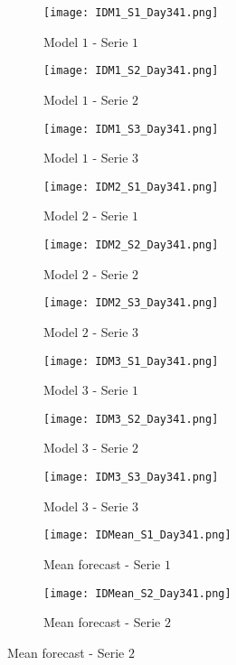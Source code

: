  \begin{figure}[ht]
 	\begin{subfigure}{0.32\textwidth}
 		\texttt{[image: IDM1\_S1\_Day341.png]}
 		\caption{Model $ 1 $ - Serie $ 1 $}
 	\end{subfigure}	 	
 	\begin{subfigure}{0.32\textwidth}
 		\texttt{[image: IDM1\_S2\_Day341.png]}
 		\caption{Model $ 1 $ - Serie $ 2 $}
 	\end{subfigure}	
 	\begin{subfigure}{0.32\textwidth}
 		\texttt{[image: IDM1\_S3\_Day341.png]}
 		\caption{Model $ 1 $ - Serie $ 3 $}
 	\end{subfigure}
  	\begin{subfigure}{0.32\textwidth}
 		\texttt{[image: IDM2\_S1\_Day341.png]}
 		\caption{Model $ 2 $ - Serie $ 1 $}
 	\end{subfigure}	 	
	 \begin{subfigure}{0.32\textwidth}
	 	\texttt{[image: IDM2\_S2\_Day341.png]}
	 	\caption{Model $ 2 $ - Serie $ 2 $}
	 \end{subfigure}	
	 \begin{subfigure}{0.32\textwidth}
	 	\texttt{[image: IDM2\_S3\_Day341.png]}
	 	\caption{Model $ 2 $ - Serie $ 3 $}
	 \end{subfigure}
 	\begin{subfigure}{0.32\textwidth}
	\texttt{[image: IDM3\_S1\_Day341.png]}
	\caption{Model $3 $ - Serie $ 1 $}
	\end{subfigure}	 	
	\begin{subfigure}{0.32\textwidth}
		\texttt{[image: IDM3\_S2\_Day341.png]}
		\caption{Model $3 $ - Serie $ 2 $}
	\end{subfigure}	
	\begin{subfigure}{0.32\textwidth}
		\texttt{[image: IDM3\_S3\_Day341.png]}
		\caption{Model $3 $ - Serie $ 3 $}
	\end{subfigure}
 	\begin{subfigure}{0.32\textwidth}
		\texttt{[image: IDMean\_S1\_Day341.png]}
		\caption{Mean forecast - Serie $ 1 $}
	\end{subfigure}	 	
	\begin{subfigure}{0.32\textwidth}
		\texttt{[image: IDMean\_S2\_Day341.png]}
		\caption{Mean forecast - Serie $ 2 $}
	\end{subfigure}	

\end{figure}
